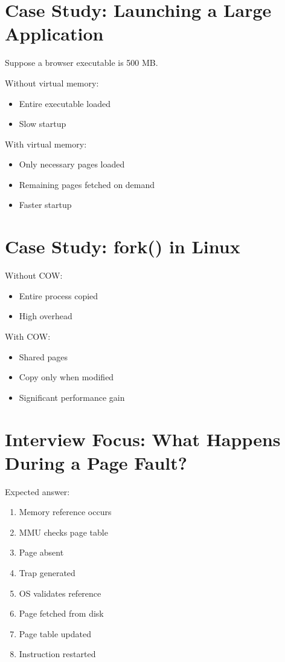 \section{Case Study: Launching a Large Application}

Suppose a browser executable is 500 MB.

Without virtual memory:

\begin{itemize}
\item Entire executable loaded
\item Slow startup
\end{itemize}

With virtual memory:

\begin{itemize}
\item Only necessary pages loaded
\item Remaining pages fetched on demand
\item Faster startup
\end{itemize}

\section{Case Study: fork() in Linux}

Without COW:

\begin{itemize}
\item Entire process copied
\item High overhead
\end{itemize}

With COW:

\begin{itemize}
\item Shared pages
\item Copy only when modified
\item Significant performance gain
\end{itemize}

\section{Interview Focus: What Happens During a Page Fault?}

Expected answer:

\begin{enumerate}
\item Memory reference occurs
\item MMU checks page table
\item Page absent
\item Trap generated
\item OS validates reference
\item Page fetched from disk
\item Page table updated
\item Instruction restarted
\end{enumerate}

